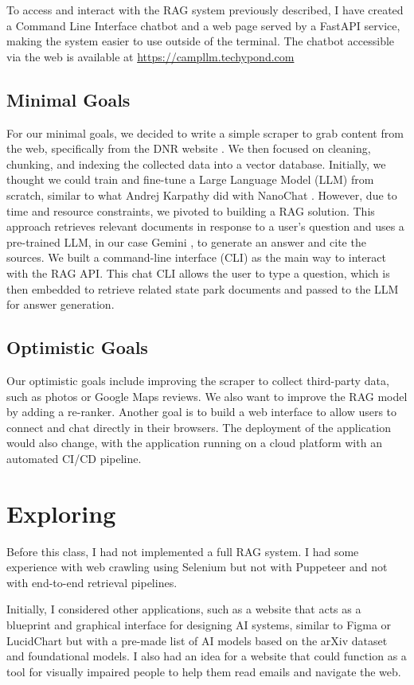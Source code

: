 \documentclass[11pt]{article}
\begin{document}
To access and interact with the RAG system previously described, I have created a Command Line Interface chatbot and a web page served by a FastAPI service, making the system easier to use outside of the terminal. The chatbot accessible via the web is available at \href{https://campllm.techypond.com/}{https://campllm.techypond.com}

\subsection{Minimal Goals}
For our minimal goals, we decided to write a simple scraper to grab content from the web, specifically from the DNR website \cite{dnr}. We then focused on cleaning, chunking, and indexing the collected data into a vector database. Initially, we thought we could train and fine-tune a Large Language Model (LLM) from scratch, similar to what Andrej Karpathy did with NanoChat \cite{nanochat}. However, due to time and resource constraints, we pivoted to building a RAG solution. This approach retrieves relevant documents in response to a user's question and uses a pre-trained LLM, in our case Gemini \cite{gemini}, to generate an answer and cite the sources. We built a command-line interface (CLI) as the main way to interact with the RAG API. This chat CLI allows the user to type a question, which is then embedded to retrieve related state park documents and passed to the LLM for answer generation.

\subsection{Optimistic Goals}
Our optimistic goals include improving the scraper to collect third-party data, such as photos or Google Maps reviews. We also want to improve the RAG model by adding a re-ranker. Another goal is to build a web interface to allow users to connect and chat directly in their browsers. The deployment of the application would also change, with the application running on a cloud platform with an automated CI/CD pipeline.

\section{Exploring}
Before this class, I had not implemented a full RAG system. I had some experience with web crawling using Selenium \cite{selenium} but not with Puppeteer \cite{puppeteer} and not with end-to-end retrieval pipelines.

Initially, I considered other applications, such as a website that acts as a blueprint and graphical interface for designing AI systems, similar to Figma or LucidChart but with a pre-made list of AI models based on the arXiv dataset and foundational models. I also had an idea for a website that could function as a tool for visually impaired people to help them read emails and navigate the web.
\end{document}
